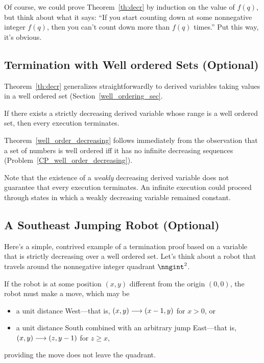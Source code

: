Of course, we could prove Theorem~\ref{th:decr} by induction on the value
of $f(q)$, but think about what it says: ``If you start counting down at
some nonnegative integer $f(q)$, then you can't count down more than
$f(q)$ times.''  Put this way, it's obvious.


\subsection{Termination with Well ordered Sets (Optional)}

Theorem~\ref{th:decr} generalizes straightforwardly to derived
variables taking values in a well ordered set
(Section~\ref{well_ordering_sec}.

\begin{theorem}\label{well_order_decreasing}
  If there exists a strictly decreasing derived variable whose range
  is a well ordered set, then every execution terminates.
\end{theorem}

Theorem~\ref{well_order_decreasing} follows immediately from the
observation that a set of numbers is well ordered iff it has no
infinite decreasing sequences
(Problem~\ref{CP_well_order_decreasing}).

Note that the existence of a \emph{weakly} decreasing derived variable
does not guarantee that every execution terminates.  An
infinite execution could proceed through states in which a weakly
decreasing variable remained constant.


\subsection{A Southeast Jumping Robot (Optional)}

\iffalse Begin by defining the trivial ``pick how long'' game: P1 picks $n
\in \nngint$, the P2 and P1 alternate making forced moves.  The game
ends after $n$ forced moves; the last person to move wins.  So P1 strategy
is ``pick and even number.''  Insert here the discussion of ``terminates,
but no bound on number of steps...'' used below.

May also tell the ``guess a bigger number game''joke.
\fi

Here's a simple, contrived example of a termination proof based on a
variable that is strictly decreasing over a well ordered set.  Let's
think about a robot that travels around the nonnegative integer
quadrant $\nngint^2$.

If the robot is at some position $(x,y)$ different from the origin
$(0,0)$, the robot must make a move, which may be
\begin{itemize}

\item a unit distance West---that is, $(x,y) \mathrel{\longrightarrow} (x-1,y)$ for
  $x>0$, or

\item a unit distance South combined with an arbitrary jump
  East---that is, $(x,y) \mathrel{\longrightarrow} (z,y-1)$ for $z\geq x$,
\end{itemize}
 providing the move does not leave the quadrant.

